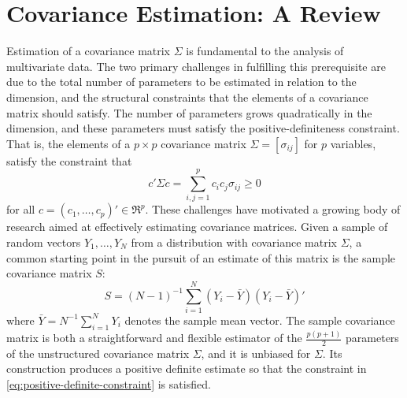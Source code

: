 

\chapter{Covariance Estimation: A Review} \label{background-review-chapter}

\indent

Estimation of a  covariance matrix $\Sigma$ is fundamental to the analysis of multivariate data. The two primary challenges in fulfilling this prerequisite are due to the total number of parameters to be estimated in relation to the dimension, and the structural constraints that the elements of a covariance matrix should satisfy. The number of parameters grows quadratically in the dimension, and these parameters must satisfy the positive-definiteness constraint. That is, the elements of a $p \times p$ covariance matrix $\Sigma = \left[ \sigma_{ij} \right]$ for $p$ variables, satisfy the constraint that 
\begin{equation} \label{eq:positive-definite-constraint} 
c'\Sigma c = \sum_{i,j = 1}^p c_i c_j \sigma_{ij} \ge 0
\end{equation} 
\noindent
for all $c = \left(c_1,\dots, c_p \right)' \in \Re^p$. These challenges have motivated a growing body of research aimed at effectively estimating covariance matrices. Given a sample of random vectors $Y_1,\dots, Y_N$ from a distribution with covariance matrix $\Sigma$, a common starting point in the pursuit of an estimate of this matrix is the sample covariance matrix $S$:
\begin{equation} \label{eq:sample-covariance-matrix}
S = \left(N-1\right)^{-1} \sum_{i = 1}^N \left(Y_i - \bar{Y}\right)\left(Y_i - \bar{Y}\right)'
\end{equation}
\noindent
where $\bar{Y} = N^{-1}\sum_{i=1}^N Y_i$ denotes the sample mean vector. The sample covariance matrix is both a straightforward and flexible estimator of the $\frac{p\left(p+1\right)}{2}$ parameters of the unstructured covariance matrix $\Sigma$, and it is unbiased for $\Sigma$. Its construction produces a positive definite estimate so that the constraint in \eqref{eq:positive-definite-constraint} is satisfied. 

\bigskip

